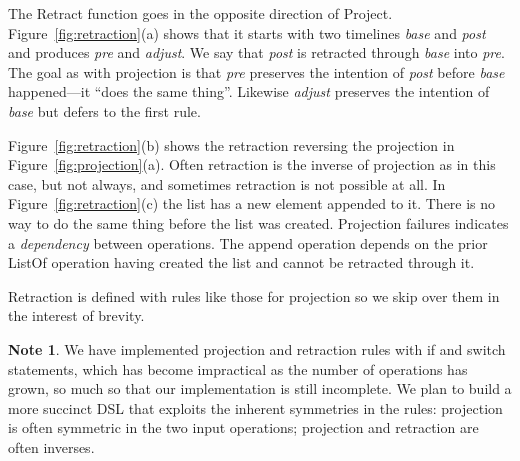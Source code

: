 \documentclass[english,submission]{programming}
\theoremstyle{definition}
\newtheorem*{note}{Note}
\begin{document}
The \textsf{Retract} function goes in the opposite direction of \textsf{Project}. Figure~\ref{fig:retraction}(a) shows that it starts with two timelines \textit{base} and \textit{post} and produces \textit{pre} and \textit{adjust}. We say that \textit{post} is retracted through \textit{base} into \textit{pre}. The goal as with projection is that \textit{pre} preserves the intention of \textit{post} before \textit{base} happened---it ``does the same thing''. Likewise \textit{adjust} preserves the intention of \textit{base} but defers to the first rule.

Figure~\ref{fig:retraction}(b) shows the retraction reversing the projection in Figure~\ref{fig:projection}(a). Often retraction is the inverse of projection as in this case, but not always, and sometimes retraction is not possible at all. In Figure~\ref{fig:retraction}(c) the list has a new element appended to it. There is no way to do the same thing before the list was created. Projection failures indicates a \textit{dependency} between operations. The \textsf{append} operation depends on the prior \textsf{ListOf} operation having created the list and cannot be retracted through it.

Retraction is defined with rules like those for projection so we skip over them in the interest of brevity.
\begin{note}
  We have implemented projection and retraction rules with if and switch statements, which has become impractical as the number of operations has grown, so much so that our implementation is still incomplete. We plan to build a more succinct DSL that exploits the inherent symmetries in the rules: projection is often symmetric in the two input operations; projection and retraction are often inverses.
\end{note}
\end{document}
